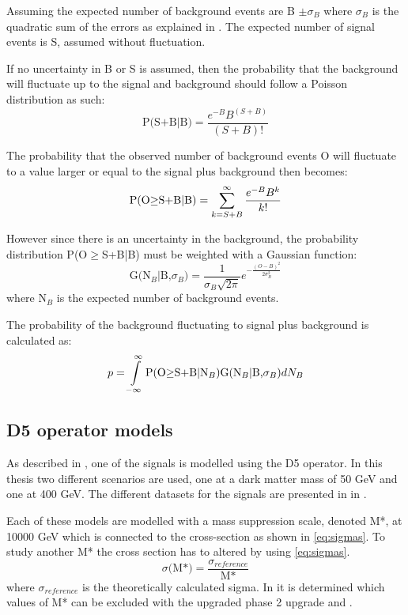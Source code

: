 Assuming the expected number of background events are B $\pm \sigma_B$ where $\sigma_B$ is the quadratic sum of the errors as explained in . The expected number of signal events is S, assumed without fluctuation. 

If no uncertainty in B or S is assumed, then the probability that the background will fluctuate up to the signal and background should follow a Poisson distribution as such:
\begin{equation}
\text{P(S+B|B)}=\frac{e^{-B}B^{(S+B)}}{(S+B)!}
\end{equation} 

The probability that the observed number of background events O will fluctuate to a value larger or equal to the signal plus background then becomes:
\begin{equation}
\text{P(O$ \geq$S+B|B)} =\sum_{k=S+B}^{\infty}  \frac{e^{-B}B^k}{k!}
\end{equation} 

However since there is an uncertainty in the background, the probability distribution P(O$ \geq$S+B|B) must be weighted with a Gaussian function:
\begin{equation}
 \text{G(N$_B$|B,$\sigma_B$)}=\frac{1}{\sigma_B \sqrt{2 \pi}} e^{-\frac{(O-B)^2}{2\sigma_B^2}}
\end{equation}
where N$_B$ is the expected number of background events. 

The probability of the background fluctuating to signal plus background is calculated as:
\begin{equation}
p = \int\limits_{-\infty}^{\infty} \text{P(O$ \geq$S+B|N$_B$)G(N$_B$|B,$\sigma_B$)} dN_B
\end{equation}

\subsection{D5 operator models}\label{sec:signal:subsec:d5}
As described in , one of the signals is modelled using the D5 operator. In this thesis two different scenarios are used, one at a dark matter mass of 50 GeV and one at 400 GeV. The different datasets for the signals are presented in  in .

Each of these models are modelled with a mass suppression scale, denoted M*, at 10000 GeV which is connected to the cross-section as shown in \eqref{eq:sigmas}. To study another M* the cross section has to altered by using \eqref{eq:sigmas}.
\begin{equation}\label{eq:sigmas}
\sigma \text{(M*)} = \frac{\sigma_{reference}}{\text{M*}} 
\end{equation}
where $\sigma_{reference}$ is the theoretically calculated sigma.
In  it is determined which values of M* can be excluded with the upgraded \abbrLHC phase 2 upgrade and \abbrATLAS .

